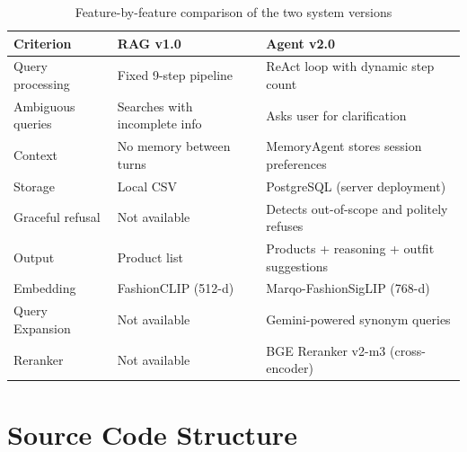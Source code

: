 \documentclass[12pt, twoside]{report}
\begin{document}
\begin{table}[H]
\centering
\begin{tabular}{lll}
\toprule
\textbf{Criterion} & \textbf{RAG v1.0} & \textbf{Agent v2.0}\\
\midrule
Query processing  & Fixed 9-step pipeline & ReAct loop with dynamic step count\\
Ambiguous queries & Searches with incomplete info & Asks user for clarification\\
Context           & No memory between turns & MemoryAgent stores session preferences\\
Storage           & Local CSV & PostgreSQL (server deployment)\\
Graceful refusal  & Not available & Detects out-of-scope and politely refuses\\
Output            & Product list & Products + reasoning + outfit suggestions\\
Embedding         & FashionCLIP (512-d) & Marqo-FashionSigLIP (768-d)\\
Query Expansion   & Not available & Gemini-powered synonym queries\\
Reranker          & Not available & BGE Reranker v2-m3 (cross-encoder)\\
\bottomrule
\end{tabular}
\caption{Feature-by-feature comparison of the two system versions}
\end{table}

\section{Source Code Structure}
\end{document}

